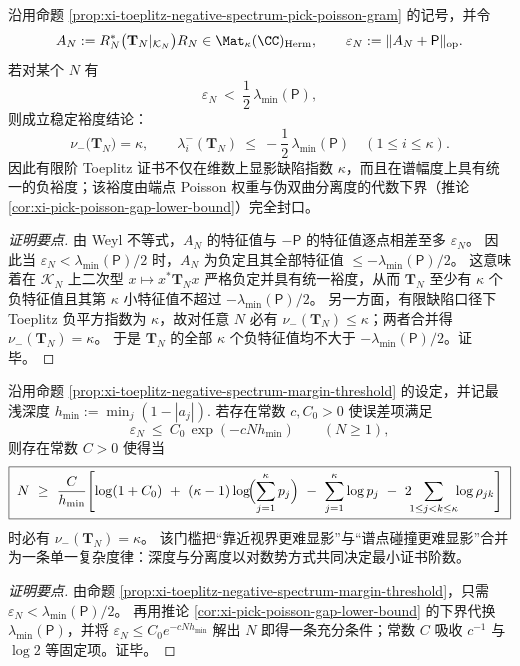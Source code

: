 \begin{proposition}\label{prop:xi-toeplitz-negative-spectrum-margin-threshold}
沿用命题 \ref{prop:xi-toeplitz-negative-spectrum-pick-poisson-gram} 的记号，并令
\[
A_N:=R_N^\ast\bigl(\mathbf{T}_N|_{\mathcal K_N}\bigr)R_N\in\Mat_{\kappa}(\CC)_{\mathrm{Herm}},
\qquad
\varepsilon_N:=\|A_N+\mathsf P\|_{\mathrm{op}}.
\]
若对某个 \(N\) 有
\[
\varepsilon_N\ <\ \frac12\,\lambda_{\min}(\mathsf P),
\]
则成立稳定裕度结论：
\[
\boxed{\;
\nu_-\!\bigl(\mathbf{T}_N\bigr)=\kappa,
\qquad
\lambda_i^{-}(\mathbf{T}_N)\ \le\ -\frac12\,\lambda_{\min}(\mathsf P)\quad(1\le i\le \kappa).\;}
\]
因此有限阶 Toeplitz 证书不仅在维数上显影缺陷指数 \(\kappa\)，而且在谱幅度上具有统一的负裕度；该裕度由端点 Poisson 权重与伪双曲分离度的代数下界（推论 \ref{cor:xi-pick-poisson-gap-lower-bound}）完全封口。
\end{proposition}
\begin{proof}[证明要点]
由 Weyl 不等式，\(A_N\) 的特征值与 \(-\mathsf P\) 的特征值逐点相差至多 \(\varepsilon_N\)。
因此当 \(\varepsilon_N<\lambda_{\min}(\mathsf P)/2\) 时，\(A_N\) 为负定且其全部特征值 \(\le-\lambda_{\min}(\mathsf P)/2\)。
这意味着在 \(\mathcal K_N\) 上二次型 \(x\mapsto x^\ast\mathbf{T}_N x\) 严格负定并具有统一裕度，从而 \(\mathbf{T}_N\) 至少有 \(\kappa\) 个负特征值且其第 \(\kappa\) 小特征值不超过 \(-\lambda_{\min}(\mathsf P)/2\)。
另一方面，有限缺陷口径下 Toeplitz 负平方指数为 \(\kappa\)，故对任意 \(N\) 必有 \(\nu_-(\mathbf{T}_N)\le \kappa\)；两者合并得 \(\nu_-(\mathbf{T}_N)=\kappa\)。
于是 \(\mathbf{T}_N\) 的全部 \(\kappa\) 个负特征值均不大于 \(-\lambda_{\min}(\mathsf P)/2\)。证毕。
\end{proof}

\begin{corollary}\label{cor:xi-toeplitz-visibility-complexity-threshold}
沿用命题 \ref{prop:xi-toeplitz-negative-spectrum-margin-threshold} 的设定，并记最浅深度
\(
h_{\min}:=\min_j(1-|a_j|).
\)
若存在常数 \(c,C_0>0\) 使误差项满足
\[
\varepsilon_N\ \le\ C_0\,\exp(-cNh_{\min})\qquad(N\ge 1),
\]
则存在常数 \(C>0\) 使得当
\[
\boxed{\;
N\ \ge\ \frac{C}{h_{\min}}\Biggl[
\log(1+C_0)\ +\ (\kappa-1)\log\!\Bigl(\sum_{j=1}^{\kappa}p_j\Bigr)
\ -\ \sum_{j=1}^{\kappa}\log p_j
\ -\ 2\!\!\sum_{1\le j<k\le\kappa}\!\!\log\rho_{jk}
\Biggr]\;}
\]
时必有 \(\nu_-(\mathbf{T}_N)=\kappa\)。
该门槛把“靠近视界更难显影”与“谱点碰撞更难显影”合并为一条单一复杂度律：深度与分离度以对数势方式共同决定最小证书阶数。
\end{corollary}
\begin{proof}[证明要点]
由命题 \ref{prop:xi-toeplitz-negative-spectrum-margin-threshold}，只需 \(\varepsilon_N<\lambda_{\min}(\mathsf P)/2\)。
再用推论 \ref{cor:xi-pick-poisson-gap-lower-bound} 的下界代换 \(\lambda_{\min}(\mathsf P)\)，并将
\(\varepsilon_N\le C_0e^{-cNh_{\min}}\) 解出 \(N\) 即得一条充分条件；常数 \(C\) 吸收 \(c^{-1}\) 与 \(\log 2\) 等固定项。证毕。
\end{proof}

